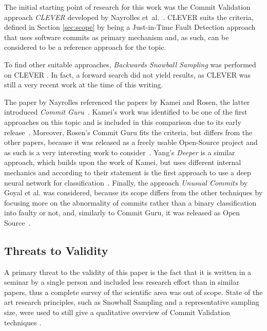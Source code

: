The initial starting point of research for this work was the Commit Validation approach \textit{CLEVER} developed by Nayrolles et~al.~\cite{Nayrolles2018}. CLEVER suits the criteria, defined in Section \ref{sec:scope} by being a Just-in-Time Fault Detection approach that uses software commits as primary mechanism and, as such, can be considered to be a reference approach for the topic.  

To find other suitable approaches, \textit{Backwards Snowball Sampling} was performed on CLEVER \cite{10.2307/2237615}. In fact, a forward search did not yield results, as CLEVER was still a very recent work at the time of this writing.

The paper by Nayrolles referenced the papers by Kamei and Rosen, the latter introduced \textit{Commit Guru}~\cite{Nayrolles2018}. Kamei's work was identified to be one of the first approaches on this topic and is included in this comparison due to its early release~\cite{Kamei2013}. Moreover, Rosen's Commit Guru fits the criteria, but differs from the other papers, because it was released as a freely usable Open-Source project and as such is a very interesting work to consider~\cite{Rosen2015}. Yang's \textit{Deeper} is a similar approach, which builds upon the work of Kamei, but uses different internal mechanics and according to their statement is the first approach to use a deep neural network for classification~\cite{Yang2015}. Finally, the approach \textit{Unusual Commits} by Goyal et al. was considered, because its scope differs from the other techniques by focusing more on the abnormality of commits rather than a binary classification into faulty or not, and, similarly to Commit Guru, it was released as Open Source~\cite{Goyal2017}.

\subsection{Threats to Validity}
\label{sec:threatstovalidity}

A primary threat to the validity of this paper is the fact that it is written in a seminar by a single person and included less research effort than in similar papers, thus a complete survey of the scientific area was out of scope. State of the art research principles, such as Snowball Sampling and a representative sampling size, were used to still give a qualitative overview of Commit Validation techniques \cite{10.2307/2237615}.

